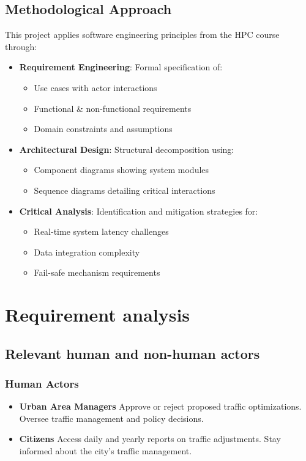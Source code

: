 \documentclass[11.5pt]{article}
\begin{document}
    \subsection{Methodological Approach}
    This project applies software engineering principles from the HPC course through:
    \begin{itemize}
        \item \textbf{Requirement Engineering}: Formal specification of:
        \begin{itemize}
            \item Use cases with actor interactions
            \item Functional \& non-functional requirements
            \item Domain constraints and assumptions
        \end{itemize}
        
        \item \textbf{Architectural Design}: Structural decomposition using:
        \begin{itemize}
            \item Component diagrams showing system modules
            \item Sequence diagrams detailing critical interactions
        \end{itemize}
        
        \item \textbf{Critical Analysis}: Identification and mitigation strategies for:
        \begin{itemize}
            \item Real-time system latency challenges
            \item Data integration complexity
            \item Fail-safe mechanism requirements
        \end{itemize}
    \end{itemize}

    \section{Requirement analysis}
    \subsection{Relevant human and non-human actors}
    \subsubsection{Human Actors}
        \begin{itemize}
        \item \textbf{Urban Area Managers}
        Approve or reject proposed traffic optimizations.
        Oversee traffic management and policy decisions.
        \item \textbf{Citizens}
        Access daily and yearly reports on traffic adjustments. 
        Stay informed about the city's traffic management.
        \end{itemize}
\end{document}
